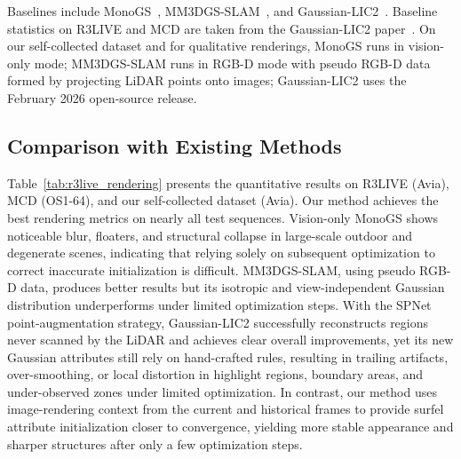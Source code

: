 \documentclass[letterpaper, 10pt, conference]{ieeeconf}
\begin{document}
Baselines include MonoGS~\cite{matsuki2024gaussian}, MM3DGS-SLAM~\cite{sun2024mm3dgs}, and Gaussian-LIC2~\cite{lang2025gaussianlic2}. Baseline statistics on R3LIVE and MCD are taken from the Gaussian-LIC2 paper~\cite{lang2025gaussianlic2}. On our self-collected dataset and for qualitative renderings, MonoGS runs in vision-only mode; MM3DGS-SLAM runs in RGB-D mode with pseudo RGB-D data formed by projecting LiDAR points onto images; Gaussian-LIC2 uses the February 2026 open-source release.

\subsection{Comparison with Existing Methods}

Table~\ref{tab:r3live_rendering} presents the quantitative results on R3LIVE (Avia), MCD (OS1-64), and our self-collected dataset (Avia). Our method achieves the best rendering metrics on nearly all test sequences. Vision-only MonoGS shows noticeable blur, floaters, and structural collapse in large-scale outdoor and degenerate scenes, indicating that relying solely on subsequent optimization to correct inaccurate initialization is difficult. MM3DGS-SLAM, using pseudo RGB-D data, produces better results but its isotropic and view-independent Gaussian distribution underperforms under limited optimization steps. With the SPNet point-augmentation strategy, Gaussian-LIC2 successfully reconstructs regions never scanned by the LiDAR and achieves clear overall improvements, yet its new Gaussian attributes still rely on hand-crafted rules, resulting in trailing artifacts, over-smoothing, or local distortion in highlight regions, boundary areas, and under-observed zones under limited optimization. In contrast, our method uses image-rendering context from the current and historical frames to provide surfel attribute initialization closer to convergence, yielding more stable appearance and sharper structures after only a few optimization steps.
\end{document}
